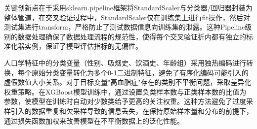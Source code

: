 \documentclass[12pt,a4paper]{ctexart}
\begin{document}
关键创新点在于采用sklearn.pipeline框架将StandardScaler与分类器/回归器封装为整体管道，在交叉验证过程中，StandardScaler仅在训练集上进行fit操作，然后对测试集进行transform，严格防止了测试数据信息向训练集的泄露。这种Pipeline级别的数据处理确保了数据处理流程的规范性，使得每个交叉验证折内都有独立的标准化器实例，保证了模型评估指标的无偏性。

人口学特征中的分类变量（性别、吸烟史、饮酒史、年龄组）采用独热编码进行转换，每个原始分类变量转化为多个0-1二进制特征，避免了有序化编码可能引入的虚假数值大小关系。对于目标变量"高血脂症"存在的类别不平衡问题，采取差异化权重策略。在XGBoost模型训练中，通过设置负类样本数与正类样本数的比值为参数，使模型在训练时自动对少数类给予更高的关注权重。这种方法避免了过度采样引入的数据重复和欠采样导致的信息丢失，在保持原始样本量和分布的前提下，通过损失函数加权来改善模型在不平衡数据上的泛化性能。
\end{document}
